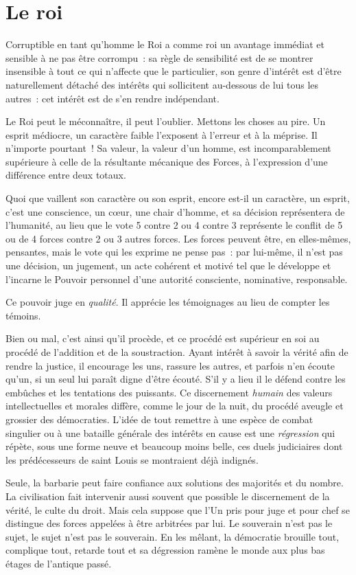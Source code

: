 \documentclass[french,twoside]{book} %
\newcommand{\astermono}{\medskip\centerline{\color{rubric}\large\selectfont{\syms ✻}}\medskip\par}%
\begin{document}
\section[{Le roi}]{Le roi}
\noindent Corruptible en tant qu’homme le Roi a comme roi un avantage immédiat et sensible à ne pas être corrompu : sa règle de sensibilité est de se montrer insensible à tout ce qui n’affecte que le particulier, son genre d’intérêt est d’être naturellement détaché des intérêts qui sollicitent au-dessous de lui tous les autres : cet intérêt est de s’en rendre indépendant.\par
Le Roi peut le méconnaître, il peut l’oublier. Mettons les choses au pire. Un esprit médiocre, un caractère faible l’exposent à l’erreur et à la méprise. Il n’importe pourtant ! Sa valeur, la valeur d’un homme, est incomparablement supérieure à celle de la résultante mécanique des Forces, à l’expression d’une différence entre deux totaux.\par
Quoi que vaillent son caractère ou son esprit, encore est-il un caractère, un esprit, c’est une conscience, un cœur, une chair d’homme, et sa décision représentera de l’humanité, au lieu que le vote 5 contre 2 ou 4 contre 3 représente le conflit de 5 ou de 4 forces contre 2 ou 3 autres forces. Les forces peuvent être, en elles-mêmes, pensantes, mais le vote qui les exprime ne pense pas : par lui-même, il n’est pas une décision, un jugement, un acte cohérent et motivé tel que le développe et l’incarne le Pouvoir personnel d’une autorité consciente, nominative, responsable.\par

\astermono

\noindent Ce pouvoir juge en \emph{qualité}. Il apprécie les témoignages au lieu de compter les témoins.\par
Bien ou mal, c’est ainsi qu’il procède, et ce procédé est supérieur en soi au procédé de l’addition et de la soustraction. Ayant intérêt à savoir la vérité afin de rendre la justice, il encourage les uns, rassure les autres, et parfois n’en écoute qu’un, si un seul lui paraît digne d’être écouté. S’il y a lieu il le défend contre les embûches et les tentations des puissants. Ce discernement \emph{humain} des valeurs intellectuelles et morales diffère, comme le jour de la nuit, du procédé aveugle et grossier des démocraties. L’idée de tout remettre à une espèce de combat singulier ou à une bataille générale des intérêts en cause est une \emph{régression} qui répète, sous une forme neuve et beaucoup moins belle, ces duels judiciaires dont les prédécesseurs de saint Louis se montraient déjà indignés.\par
Seule, la barbarie peut faire confiance aux solutions des majorités et du nombre. La civilisation fait intervenir aussi souvent que possible le discernement de la vérité, le culte du droit. Mais cela suppose que l’Un pris pour juge et pour chef se distingue des forces appelées à être arbitrées par lui. Le souverain n’est pas le sujet, le sujet n’est pas le souverain. En les mêlant, la démocratie brouille tout, complique tout, retarde tout et sa dégression ramène le monde aux plus bas étages de l’antique passé.\par
\end{document}
